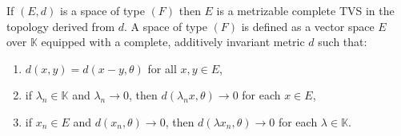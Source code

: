 If $(E, d)$ is a space of type $(F)$ then $E$ is a metrizable complete TVS in the topology derived from $d$. A space of type $(F)$ is defined as a vector space $E$ over $\mathbb{K}$ equipped with a complete, additively invariant metric $d$ such that:
\begin{enumerate}
\item[(i)] $d(x, y) = d(x - y, \theta)$ for all $x, y \in E$,
\item[(ii)] if $\lambda_n \in \mathbb{K}$ and $\lambda_n \to 0$, then $d(\lambda_n x, \theta) \to 0$ for each $x \in E$,
\item[(iii)] if $x_n \in E$ and $d(x_n, \theta) \to 0$, then $d(\lambda x_n, \theta) \to 0$ for each $\lambda \in \mathbb{K}$.
\end{enumerate}
